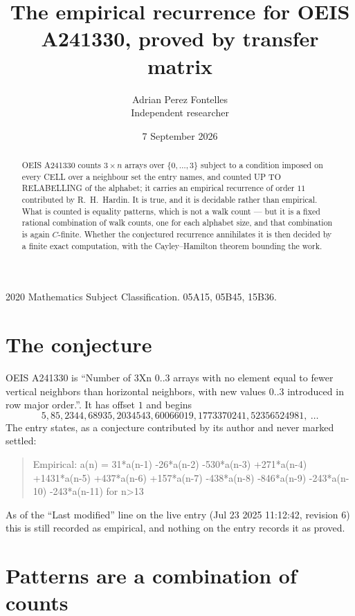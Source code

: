 \documentclass[11pt,a4paper]{article}
\title{The empirical recurrence for OEIS A241330, proved by transfer matrix}
\author{Adrian Perez Fontelles\\ \small Independent researcher}
\date{7 September 2026}
\theoremstyle{plain}
\theoremstyle{definition}
\begin{document}
\maketitle

\begin{abstract}
OEIS A241330 counts $3\times n$ arrays over $\{0,\dots,3\}$ subject to a condition imposed on
every CELL over a neighbour set the entry names, and counted UP TO RELABELLING of the
alphabet; it carries an empirical recurrence of order $11$ contributed by
R.~H.~Hardin. It is true, and it is decidable rather than empirical. What is counted is
equality patterns, which is not a walk count --- but it is a fixed rational combination of
walk counts, one for each alphabet size, and that combination is again $C$-finite. Whether the
conjectured recurrence annihilates it is then decided by a finite exact computation, with the
Cayley--Hamilton theorem bounding the work.
\end{abstract}

\noindent\small 2020 Mathematics Subject Classification. 05A15, 05B45, 15B36.\normalsize

\section{The conjecture}

OEIS A241330 is ``Number of 3Xn 0..3 arrays with no element equal to fewer vertical neighbors than horizontal neighbors, with new values 0..3 introduced in row major order.''. It has offset $1$ and begins
\[
5, 85, 2344, 68935, 2034543, 60066019, 1773370241, 52356524981,\ \dots
\]
The entry states, as a conjecture contributed by its author and never marked settled:
\begin{quote}
Empirical: a(n) = 31*a(n-1) -26*a(n-2) -530*a(n-3) +271*a(n-4) +1431*a(n-5) +437*a(n-6) +157*a(n-7) -438*a(n-8) -846*a(n-9) -243*a(n-10) -243*a(n-11) for n>13
\end{quote}
As of the ``Last modified'' line on the live entry (Jul 23 2025 11:12:42, revision 6) this is still
recorded as empirical, and nothing on the entry records it as proved.

\section{Patterns are a combination of counts}
\end{document}
